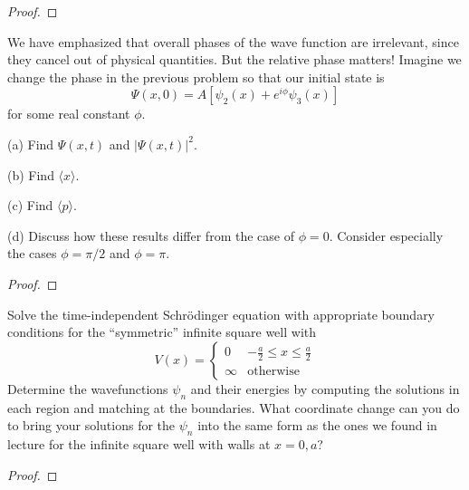 \documentclass{article}
\begin{document}
\begin{proof}
\end{proof}

\newpage

\begin{ques}\label{q5}
We have emphasized that overall phases of the wave function are irrelevant, since they
cancel out of physical quantities. But the relative phase matters! Imagine we change the
phase in the previous problem so that our initial state is
\[
\Psi(x, 0) = A[\psi_2(x) + e^{i\phi}\psi_3(x)]
\]
for some real constant $\phi$.

(a) Find $\Psi(x, t)$ and $|\Psi(x, t)|^2$.

(b) Find $\langle x \rangle$.

(c) Find $\langle p \rangle$.

(d) Discuss how these results differ from the case of $\phi = 0$. Consider especially the cases
$\phi = \pi/2$ and $\phi = \pi$.
\end{ques}

\begin{proof}
\end{proof}

\newpage

\begin{ques}\label{q6}
Solve the time-independent Schrödinger equation with appropriate boundary conditions
for the “symmetric” infinite square well with
\[
V(x) =
\begin{cases}
0 & -\frac{a}{2} \le x \le \frac{a}{2} \\
\infty & \text{otherwise}
\end{cases}
\]
Determine the wavefunctions $\psi_n$ and their energies by computing the solutions in each
region and matching at the boundaries. What coordinate change can you do to bring your
solutions for the $\psi_n$ into the same form as the ones we found in lecture for the infinite
square well with walls at $x = 0, a$?
\end{ques}

\begin{proof}
\end{proof}

\newpage
\end{document}
